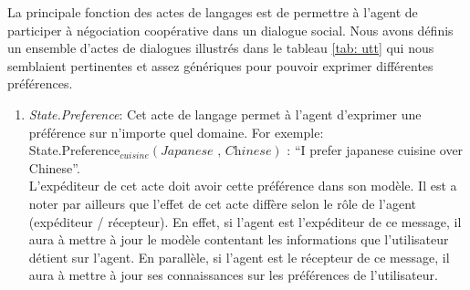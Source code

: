 \documentclass[a4paper,french]{article}
\begin{document}
\par La principale fonction des actes de langages est de permettre à l'agent de participer à négociation coopérative dans un dialogue social. Nous avons définis un ensemble d'actes de dialogues illustrés dans le tableau \ref{tab: utt} qui nous semblaient pertinentes et assez génériques  pour pouvoir exprimer différentes préférences. 
\begin{enumerate}
		\item  \textit{State.Preference}: Cet acte de langage permet à l'agent d'exprimer une préférence sur n'importe quel domaine. For exemple: \\ State.Preference$_{cuisine}(\textit{Japanese , Chinese})$ : ``I prefer japanese cuisine over Chinese''. 
		\\ L'expéditeur de cet acte doit avoir cette préférence dans son modèle. Il est a noter par ailleurs que l'effet de cet acte diffère selon le rôle de l'agent (expéditeur / récepteur). En effet, si l'agent est l'expéditeur de ce message, il aura à mettre à jour le modèle contentant les informations que l'utilisateur détient sur l'agent. En parallèle, si l'agent est le récepteur de ce message, il aura à mettre à jour ses connaissances sur les préférences de l'utilisateur. 


\end{enumerate}
\end{document}
